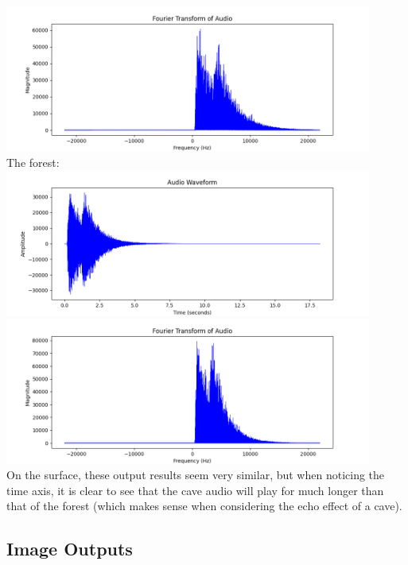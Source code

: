 \documentclass[notitlepage]{article}
\begin{document}
\\
\includegraphics[width=4.75in]{../samples/audio/dog_bark_dry_convolve_cave_fourier_transform.png}
\\
The forest:
\\
\includegraphics[width=4.75in]{../samples/audio/dog_bark_dry_convolve_forest_waveform.png}
\\
\includegraphics[width=4.75in]{../samples/audio/dog_bark_dry_convolve_forest_fourier_transform.png}
\\
On the surface, these output results seem very similar, but when noticing
the time axis, it is clear to see that the cave audio will play for
much longer than that of the forest (which makes sense when considering the
echo effect of a cave).

\subsection{Image Outputs}
\end{document}
